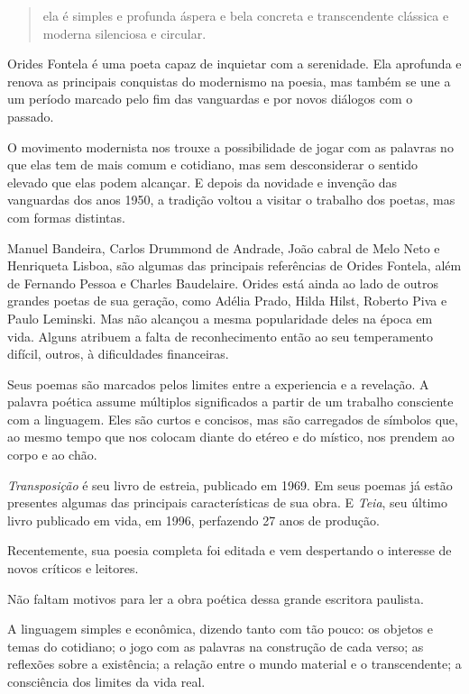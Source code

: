 \documentclass[12pt]{extarticle}
\begin{document}
\begin{verse}
ela é simples e profunda
áspera e bela 
concreta e transcendente
clássica e moderna
silenciosa e circular.
\end{verse}

Orides Fontela é uma poeta capaz de inquietar com a serenidade.
Ela aprofunda e renova as principais conquistas do modernismo na poesia, 
mas também se une a um período marcado pelo fim das vanguardas e 
por novos diálogos com o passado.

 

O movimento modernista nos trouxe a possibilidade de jogar com as palavras no que elas tem de mais comum e cotidiano, mas sem desconsiderar o sentido elevado que elas podem alcançar.
E depois da novidade e invenção das vanguardas dos anos 1950, a tradição voltou a visitar o trabalho dos poetas, mas com formas distintas.

Manuel Bandeira, Carlos Drummond de Andrade, João cabral de Melo Neto  e Henriqueta Lisboa,    são algumas das principais referências de Orides Fontela, além de Fernando Pessoa e Charles Baudelaire.
Orides está ainda ao  lado de outros grandes poetas de sua geração, como Adélia Prado, Hilda Hilst, Roberto Piva e Paulo Leminski.
Mas não alcançou a mesma popularidade deles na época em vida.
Alguns atribuem a falta de reconhecimento então ao seu temperamento difícil, 
outros, à dificuldades financeiras.

Seus poemas são marcados pelos limites entre a experiencia e a revelação.
A palavra poética assume múltiplos significados a partir de um trabalho consciente com a linguagem. Eles são curtos e concisos, mas são carregados de símbolos que, ao mesmo tempo que nos colocam diante do etéreo e do místico, nos prendem ao corpo e ao chão.

\textit{Transposição} é seu livro de estreia, publicado em 1969. 
Em seus poemas já estão presentes algumas das principais características de sua obra.
E \textit{Teia}, seu último livro publicado em vida, em  1996, perfazendo 27 anos de produção.

Recentemente, sua poesia completa foi editada e vem despertando o interesse de novos críticos e leitores.

Não faltam motivos para ler a obra poética dessa grande escritora paulista.

A linguagem simples e econômica, dizendo  tanto com tão pouco:
os objetos e temas do cotidiano;
o jogo com as palavras na construção de cada verso;
as reflexões sobre a existência;
a relação entre o mundo material e o transcendente;
a consciência dos limites da vida real.
\end{document}
